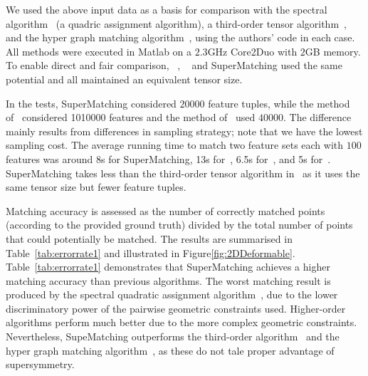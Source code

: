 We used the above input data as a basis for comparison
 with the spectral algorithm~\cite{Cour06} (a quadric assignment algorithm),
a third-order tensor algorithm~\cite{Duchenne09},
and the hyper graph matching algorithm~\cite{Zass08}, using the authors' code in each case.
All methods were executed in Matlab on a $2.3$GHz Core2Duo with $2$GB memory.
To enable direct and fair comparison,
~\cite{Duchenne09}, ~\cite{Zass08} and SuperMatching
used the same potential and
all maintained an equivalent tensor size.

In the tests, SuperMatching considered $20000$ feature tuples, while the method of~\cite{Duchenne09} considered 1010000 features  and the method of~\cite{Zass08} used $40000$.
The difference  mainly results from differences in sampling strategy; note that we have the lowest  sampling cost.
The average running time to match two feature sets each with $100$ features was around 8s for SuperMatching, 13s for~\cite{Duchenne09}, 6.5s for~\cite{Zass08}, and 5s for~\cite{Cour06}.
SuperMatching takes less  than the third-order tensor algorithm in~\cite{Duchenne09} as it uses the same tensor size but fewer feature tuples.

Matching accuracy is assessed as the number of correctly matched points (according to the provided ground truth) divided by the total number of points that could potentially be matched.
The results are summarised in Table~\ref{tab:errorrate1} and  illustrated in Figure\ref{fig:2DDeformable}.
Table~\ref{tab:errorrate1} demonstrates that SuperMatching achieves a higher matching accuracy than previous algorithms.
The worst matching result is produced by the spectral quadratic assignment algorithm~\cite{Cour06},
due to the lower discriminatory power of the pairwise geometric constraints used.
Higher-order algorithms perform much better due to the more complex geometric constraints.
Nevertheless, SupeMatching outperforms the third-order algorithm~\cite{Duchenne09} and the hyper graph matching algorithm~\cite{Zass08}, as these do not tale proper advantage of supersymmetry.


